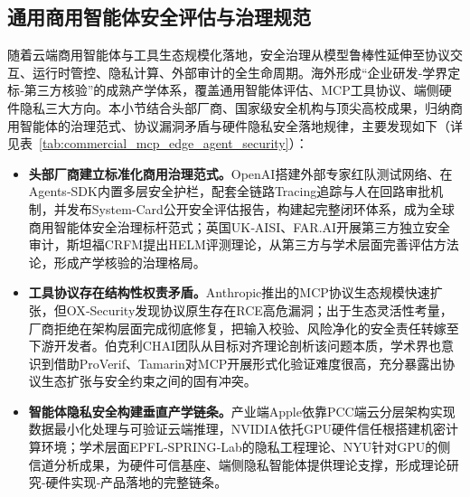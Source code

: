 \subsection{通用商用智能体安全评估与治理规范}
随着云端商用智能体与工具生态规模化落地，安全治理从模型鲁棒性延伸至协议交互、运行时管控、隐私计算、外部审计的全生命周期。海外形成“企业研发‑学界定标‑第三方核验”的成熟产学体系，覆盖通用智能体评估、MCP工具协议、端侧硬件隐私三大方向\cite{openaiRedTeamNetwork2025,mcpFormalFramework2026,nvidiaConfidentialComputingProduct2026}。本小节结合头部厂商、国家级安全机构与顶尖高校成果，归纳商用智能体的治理范式、协议漏洞矛盾与硬件隐私安全落地规律，主要发现如下（详见表~\ref{tab:commercial_mcp_edge_agent_security}）：
\begin{itemize}[tabitem]
    \item \textbf{头部厂商建立标准化商用治理范式。}OpenAI搭建外部专家红队测试网络、在Agents‑SDK内置多层安全护栏，配套全链路Tracing追踪与人在回路审批机制，并发布System‑Card公开安全评估报告，构建起完整闭环体系，成为全球商用智能体安全治理标杆范式\cite{openaiChatGPTAgentSystemCard2025,openaiAgentsSDK2025,openaiGuardrailsApprovalsDoc2026}；英国UK‑AISI、FAR.AI开展第三方独立安全审计，斯坦福CRFM提出HELM评测理论，从第三方与学术层面完善评估方法论，形成产学核验的治理格局\cite{venturebeatChatGPTAgent2025}。

    \item \textbf{工具协议存在结构性权责矛盾。}Anthropic推出的MCP协议生态规模快速扩张，但OX‑Security发现协议原生存在RCE高危漏洞；出于生态灵活性考量，厂商拒绝在架构层面完成彻底修复，把输入校验、风险净化的安全责任转嫁至下游开发者。伯克利CHAI团队从目标对齐理论剖析该问题本质，学术界也意识到借助ProVerif、Tamarin对MCP开展形式化验证难度很高，充分暴露出协议生态扩张与安全约束之间的固有冲突\cite{oxSecurityMCP2026,berkeleyCHAI2026,mcpFormalFramework2026}。

    \item \textbf{智能体隐私安全构建垂直产学链条。}产业端Apple依靠PCC端云分层架构实现数据最小化处理与可验证云端推理，NVIDIA依托GPU硬件信任根搭建机密计算环境；学术层面EPFL‑SPRING‑Lab的隐私工程理论、NYU针对GPU的侧信道分析成果，为硬件可信基座、端侧隐私智能体提供理论支撑，形成理论研究‑硬件实现‑产品落地的完整链条\cite{springLab2026,karriNYU2026}。
\end{itemize}




